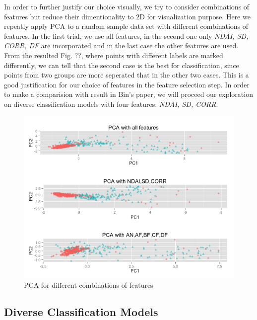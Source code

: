 \documentclass[english]{article}\usepackage{graphicx, color}
\numberwithin{equation}{section}
\numberwithin{figure}{section}
\begin{document}
In order to further justify our choice visually, we try to consider combinations of features but reduce their dimentionality to 2D for visualization purpose. Here we repeatly apply PCA to a random sample data set with different combinations of features. In the first trial, we use all features, in the second one only \textit{NDAI, SD, CORR, DF} are incorporated and in the last case the other features are used. From the resulted Fig. ??, where points with different labels are marked differently, we can tell that the second case is the best for classification, since points from two groups are more seperated that in the other two cases. This is a good justification for our choice of features in the feature selection step. In order to make a comparision with result in Bin's paper,  we will proceed our exploration on diverse classification models with four features: \textit{NDAI, SD, CORR}.

\begin{figure}[!h]
  \begin{center}
    \includegraphics[width=\columnwidth]{figures/PCA_selection.png}
  \end{center}
  \caption{PCA for different combinations of features}
  \label{fig:PCA}
\end{figure}


\subsection{Diverse Classification Models}
\end{document}
